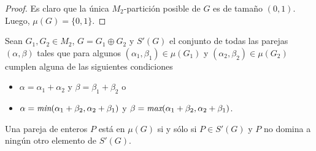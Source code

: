 \begin{proof}
Es claro que la única $M_2$-partición posible de $G$ es de tamaño $(0,1)$. Luego, $\mu(G)=\{0,1\}$. 
\end{proof}

\begin{lemma}\label{lema_parejas_07}
Sean $G_1,G_2\in M_2$, $G=G_1 \oplus G_2$ y $S'(G)$ el conjunto de todas las parejas $(\alpha, \beta)$ tales que para algunos $(\alpha_1,\beta_1)\in \mu(G_1)$ y $(\alpha_2,\beta_2)\in \mu(G_2)$ cumplen alguna de las siguientes condiciones
\begin{itemize}
    \item $\alpha = \alpha_1+\alpha_2$ y $\beta = \beta_1 + \beta_2$ o
    \item $\alpha = \emph{min}(\alpha_1+\beta_2, \alpha_2+\beta_1)$ y $\beta = \emph{max}(\alpha_1+\beta_2, \alpha_2+\beta_1)$. 
\end{itemize}
Una pareja de enteros $P$ está en $\mu(G)$ si y sólo si $P\in S'(G)$ y $P$ no domina a ningún otro elemento de $S'(G)$.
\end{lemma}

